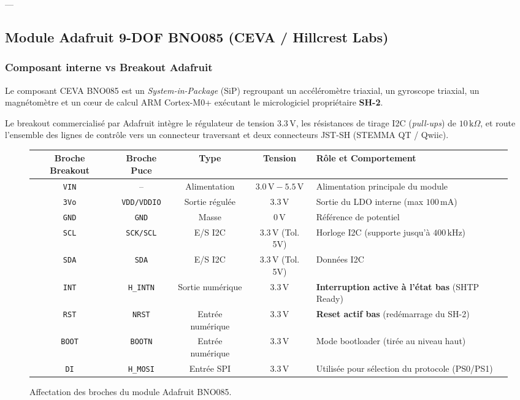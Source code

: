 \documentclass[../Materiel.tex]{subfiles}
\begin{document}
---

\subsection{Module Adafruit 9-DOF BNO085 (CEVA / Hillcrest Labs)}

\subsubsection{Composant interne vs Breakout Adafruit}
Le composant CEVA BNO085 est un \textit{System-in-Package} (SiP) regroupant un accéléromètre triaxial, un gyroscope triaxial, un magnétomètre et un cœur de calcul ARM Cortex-M0+ exécutant le micrologiciel propriétaire \textbf{SH-2}.

Le breakout commercialisé par Adafruit intègre le régulateur de tension $3.3\,\text{V}$, les résistances de tirage I2C (\textit{pull-ups}) de $10\,\text{k}\Omega$, et route l'ensemble des lignes de contrôle vers un connecteur traversant et deux connecteurs JST-SH (STEMMA QT / Qwiic).

\begin{figure}[htbp]
\centering
\small
\begin{tabular}{|c|c|c|c|l|}
\hline
\textbf{Broche Breakout} & \textbf{Broche Puce} & \textbf{Type} & \textbf{Tension} & \textbf{Rôle et Comportement} \\
\hline
\texttt{VIN} & -- & Alimentation & $3.0\,\text{V} - 5.5\,\text{V}$ & Alimentation principale du module \\
\texttt{3Vo} & \texttt{VDD/VDDIO} & Sortie régulée & $3.3\,\text{V}$ & Sortie du LDO interne (max $100\,\text{mA}$) \\
\texttt{GND} & \texttt{GND} & Masse & $0\,\text{V}$ & Référence de potentiel \\
\texttt{SCL} & \texttt{SCK/SCL} & E/S I2C & $3.3\,\text{V}$ (Tol. 5V) & Horloge I2C (supporte jusqu'à $400\,\text{kHz}$) \\
\texttt{SDA} & \texttt{SDA} & E/S I2C & $3.3\,\text{V}$ (Tol. 5V) & Données I2C \\
\texttt{INT} & \texttt{H\_INTN} & Sortie numérique & $3.3\,\text{V}$ & \textbf{Interruption active à l'état bas} (SHTP Ready) \\
\texttt{RST} & \texttt{NRST} & Entrée numérique & $3.3\,\text{V}$ & \textbf{Reset actif bas} (redémarrage du SH-2) \\
\texttt{BOOT} & \texttt{BOOTN} & Entrée numérique & $3.3\,\text{V}$ & Mode bootloader (tirée au niveau haut) \\
\texttt{DI} & \texttt{H\_MOSI} & Entrée SPI & $3.3\,\text{V}$ & Utilisée pour sélection du protocole (PS0/PS1) \\
\hline
\end{tabular}
\caption{Affectation des broches du module Adafruit BNO085.}
\end{figure}
\end{document}
